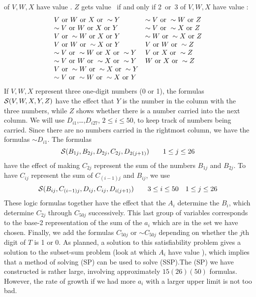 of $V,W,X$ have value \T. $Z$ gets value \T\ if and only if 
2~or~3 of $V,W,X$ have value \T:$$\begin{array}{ll}
V\hbox{ or } W\hbox{ or } X\hbox{ or } \sim Y & \sim V\hbox{ or }\sim W\hbox{ or } Z\\
\sim V\hbox{ or } W\hbox{ or } X\hbox{ or } Y & \sim V\hbox{ or }\sim X\hbox{ or } Z\\
V\hbox{ or } \sim W\hbox{ or } X\hbox{ or } Y & \sim W\hbox{ or }\sim X\hbox{ or } Z\\
V\hbox{ or } W\hbox{ or } \sim X\hbox{ or } Y & V\hbox{ or } W\hbox{ or } \sim Z\\
\sim V\hbox{ or }\sim W\hbox{ or } X\hbox{ or } \sim Y &  V\hbox{ or } X\hbox{ or }\sim Z\\
\sim V\hbox{ or } W\hbox{ or }\sim X\hbox{ or } \sim Y &  W\hbox{ or } X\hbox{ or }\sim Z\\
V\hbox{ or }\sim W\hbox{ or }\sim X\hbox{ or } \sim Y \\
\sim V\hbox{ or }\sim W\hbox{ or }\sim X\hbox{ or } Y \end{array}$$
If $V,W,X$ represent three one-digit numbers 
(0 or 1), the formulas ${\cal S}(V,W,X,Y,Z)$ have
the effect that $Y$ is the number in the column with the three numbers,
while $Z$ shows whether there is a number carried into the next column.
\pq We will use $D_{i1}$,\dots,$D_{i27}$, $2\le i\le50$, to keep track of
numbers being carried. Since there are no numbers carried in the rightmost
column, we have the formulas $\sim D_{i1}$.  The formulas
$${\cal S}(B_{1j},B_{2j},D_{2j},C_{2j},D_{2(j+1)})\qquad1\le j\le26$$
have the effect of making $C_{2j}$ represent the sum of the numbers $B_{1j}$
and $B_{2j}$.
To have $C_{ij}$
represent the sum of $C_{(i-1)j}$ and $B_{ij}$, we use $${\cal S}(B_{ij},
C_{(i-1)j}, D_{ij},C_{ij},D_{i(j+1)})\qquad 3\le i\le50\quad1\le j\le26$$
\pq These logic formulas together  have the effect that the $A_i$ 
determine the $B_i$,
which determine $C_{2j}$ through $C_{50j}$ successively.  This last group
of variables corresponds to the base-2 representation of the sum of 
the $a_i$ which are in the set we have chosen.  Finally, we add the formulas 
$C_{50j}$ or $\sim C_{50j}$ depending on whether the $j$th
digit of $T$ is 1 or 0.  As planned, a solution to this satisfiability
problem gives a solution to the subset-sum problem (look at which $A_i$
have value \T), which implies that a method of solving (SP) can be used
to solve (SSP).\pq The (SP) we have constructed is rather large, 
involving approximately $15(26)(50)$ formulas.  However, the rate of
growth if we had more $a_i$ with a larger upper limit is not too bad.
